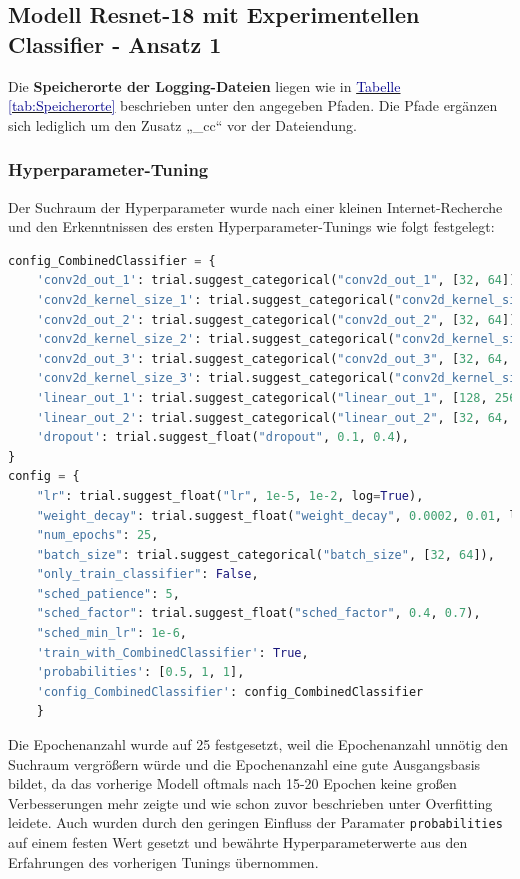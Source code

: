 \documentclass[12pt,oneside]{article}
\begin{document}
  
  
  
	\subsection{Modell Resnet-18 mit Experimentellen Classifier - Ansatz 1}
		Die \textbf{Speicherorte der Logging-Dateien} liegen wie in \hyperref[tab:Speicherorte]{\textcolor{darkblue}{Tabelle \ref*{tab:Speicherorte}}} beschrieben unter den angegeben Pfaden. Die Pfade ergänzen sich lediglich um den Zusatz „\_cc“ vor der Dateiendung.
		\subsubsection{Hyperparameter-Tuning}
	
			Der Suchraum der Hyperparameter wurde nach einer kleinen Internet-Recherche und den Erkenntnissen des ersten Hyperparameter-Tunings wie folgt festgelegt:
\begin{lstlisting}[language=Python, basicstyle=\small\ttfamily]
	config_CombinedClassifier = {
	'conv2d_out_1': trial.suggest_categorical("conv2d_out_1", [32, 64]),
	'conv2d_kernel_size_1': trial.suggest_categorical("conv2d_kernel_size_1", [3, 5]),
	'conv2d_out_2': trial.suggest_categorical("conv2d_out_2", [32, 64]),
	'conv2d_kernel_size_2': trial.suggest_categorical("conv2d_kernel_size_2", [3, 5]),
	'conv2d_out_3': trial.suggest_categorical("conv2d_out_3", [32, 64, 128]),
	'conv2d_kernel_size_3': trial.suggest_categorical("conv2d_kernel_size_3", [3, 5]),
	'linear_out_1': trial.suggest_categorical("linear_out_1", [128, 256, 512]),
	'linear_out_2': trial.suggest_categorical("linear_out_2", [32, 64, 128]),
	'dropout': trial.suggest_float("dropout", 0.1, 0.4),
}
config = {
	"lr": trial.suggest_float("lr", 1e-5, 1e-2, log=True),
	"weight_decay": trial.suggest_float("weight_decay", 0.0002, 0.01, log=True),
	"num_epochs": 25,
	"batch_size": trial.suggest_categorical("batch_size", [32, 64]),
	"only_train_classifier": False,
	"sched_patience": 5,
	"sched_factor": trial.suggest_float("sched_factor", 0.4, 0.7),
	"sched_min_lr": 1e-6,
	'train_with_CombinedClassifier': True,
	'probabilities': [0.5, 1, 1],
	'config_CombinedClassifier': config_CombinedClassifier
	}
\end{lstlisting}

	Die Epochenanzahl wurde auf 25 festgesetzt, weil die Epochenanzahl unnötig den Suchraum vergrößern würde und die Epochenanzahl eine gute Ausgangsbasis bildet, da das vorherige Modell oftmals nach 15-20 Epochen keine großen Verbesserungen mehr zeigte und wie schon zuvor beschrieben unter Overfitting leidete. Auch wurden durch den geringen Einfluss der Paramater \texttt{probabilities} auf einem festen Wert gesetzt und bewährte Hyperparameterwerte aus den Erfahrungen des vorherigen Tunings übernommen.
	
\end{document}
